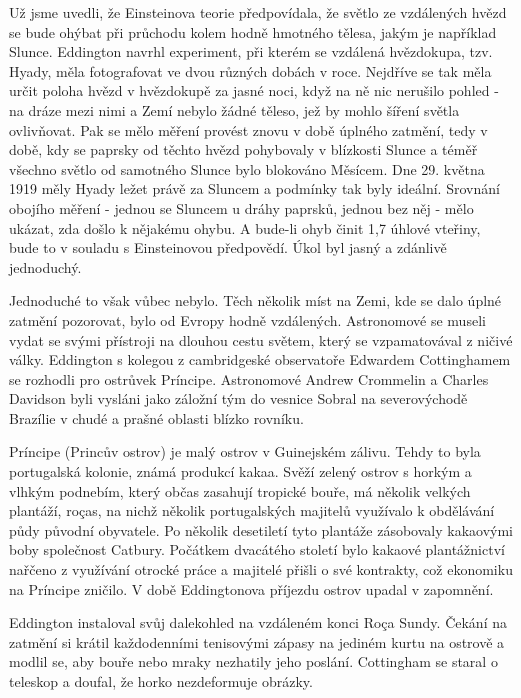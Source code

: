   Už jsme uvedli, že Einsteinova teorie předpovídala, že světlo ze vzdálených hvězd se bude ohýbat
  při průchodu kolem hodně hmotného tělesa, jakým je například Slunce. Eddington navrhl experiment,
  při kterém se vzdálená hvězdokupa, tzv. Hyady, měla fotografovat ve dvou různých dobách v roce.
  Nejdříve se tak měla určit poloha hvězd v hvězdokupě za jasné noci, když na ně nic nerušilo pohled
  - na dráze mezi nimi a Zemí nebylo žádné těleso, jež by mohlo šíření světla ovlivňovat. Pak se
  mělo měření provést znovu v době úplného zatmění, tedy v době, kdy se paprsky od těchto hvězd
  pohybovaly v blízkosti Slunce a téměř všechno světlo od samotného Slunce bylo blokováno Měsícem.
  Dne 29. května 1919 měly Hyady ležet právě za Sluncem a podmínky tak byly ideální. Srovnání
  obojího měření - jednou se Sluncem u dráhy paprsků, jednou bez něj - mělo ukázat, zda došlo k
  nějakému ohybu. A bude-li ohyb činit 1,7 úhlové vteřiny, bude to v souladu s Einsteinovou
  předpovědí. Úkol byl jasný a zdánlivě jednoduchý. 
  
  Jednoduché to však vůbec nebylo. Těch několik míst na Zemi, kde se dalo úplné zatmění pozorovat,
  bylo od Evropy hodně vzdálených. Astronomové se museli vydat se svými přístroji na dlouhou cestu
  světem, který se vzpamatovával z ničivé války. Eddington s kolegou z cambridgeské observatoře
  Edwardem Cottinghamem se rozhodli pro ostrůvek Príncipe. Astronomové Andrew Crommelin a Charles
  Davidson byli vysláni jako záložní tým do vesnice Sobral na severovýchodě Brazílie v chudé a
  prašné oblasti blízko rovníku. 

  
  Príncipe (Princův ostrov) je malý ostrov v Guinejském zálivu. Tehdy to byla portugalská kolonie,
  známá produkcí kakaa. Svěží zelený ostrov s horkým a vlhkým podnebím, který občas zasahují
  tropické bouře, má několik velkých plantáží, roças, na nichž několik portugalských majitelů
  využívalo k obdělávání půdy původní obyvatele. Po několik desetiletí tyto plantáže zásobovaly
  kakaovými boby společnost Catbury. Počátkem dvacátého století bylo kakaové plantážnictví nařčeno z
  využívání otrocké práce a majitelé přišli o své kontrakty, což ekonomiku na Príncipe zničilo. V
  době Eddingtonova příjezdu ostrov upadal v zapomnění. 
  
  Eddington instaloval svůj dalekohled na vzdáleném konci Roça Sundy. Čekání na zatmění si krátil
  každodenními tenisovými zápasy na jediném kurtu na ostrově a modlil se, aby bouře nebo mraky
  nezhatily jeho poslání. Cottingham se staral o teleskop a doufal, že horko nezdeformuje obrázky.
  
